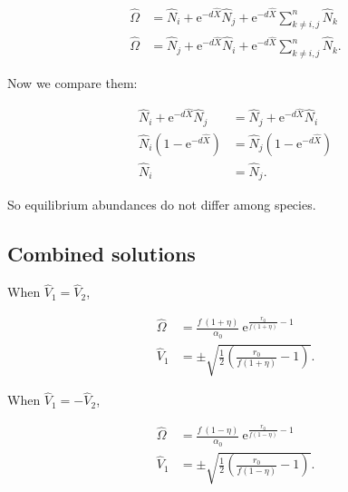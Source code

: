 \begin{equation*}
\begin{split}
    \hat{\Omega} &= \hat{N}_i + \textrm{e}^{-d \hat{X}} \hat{N}_j +
        \textrm{e}^{-d \hat{X}} \sum_{k \ne i,j}^{n}{ \hat{N}_k } \\
    \hat{\Omega} &= \hat{N}_j + \textrm{e}^{-d \hat{X}} \hat{N}_i +
        \textrm{e}^{-d \hat{X}} \sum_{k \ne i,j}^{n}{ \hat{N}_k }
    \textrm{.}
\end{split}
\end{equation*}


Now we compare them:

\begin{equation*}
\begin{split}
    \hat{N}_i + \textrm{e}^{-d \hat{X}} \hat{N}_j &=
        \hat{N}_j + \textrm{e}^{-d \hat{X}} \hat{N}_i \\
    \hat{N}_i \left( 1 - \textrm{e}^{-d \hat{X}} \right) &=
        \hat{N}_j \left( 1 - \textrm{e}^{-d \hat{X}} \right) \\
    \hat{N}_i &= \hat{N}_j
    \textrm{.}
\end{split}
\end{equation*}

So equilibrium abundances do not differ among species.





\subsection*{Combined solutions}

When $\hat{V}_1 = \hat{V}_2$,

\begin{equation}  \label{eq:two-traits-finals1}
\begin{split}
    \hat{\Omega} &= \frac{ f ~ ( 1 + \eta ) }{ \alpha_0 } ~
        \textrm{e}^{\frac{  r_0 }{ f ( 1 + \eta ) } - 1 }
        \\
    \hat{V}_1 &= \pm \sqrt{
        \frac{1}{2} \left( \frac{ r_0 }{ f (1 + \eta) } - 1 \right)
    }
    \textrm{.}
\end{split}
\end{equation}


When $\hat{V}_1 = - \hat{V}_2$,

\begin{equation}  \label{eq:two-traits-finals2}
\begin{split}
    \hat{\Omega} &= \frac{ f ~ ( 1 - \eta ) }{ \alpha_0 } ~
        \textrm{e}^{\frac{  r_0 }{ f ( 1 - \eta ) } - 1 }
        \\
    \hat{V}_1 &= \pm \sqrt{
        \frac{1}{2} \left( \frac{ r_0 }{ f (1 - \eta) } - 1 \right)
    }
    \textrm{.}
\end{split}
\end{equation}

